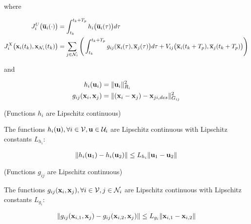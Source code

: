 where

\begin{align}
  J_i^U \big(\overline{\bm{\mathbf{u}}}_i (\cdot)\big) &=
    \int_{t_k}^{t_k + T_p} h_i \big(\overline{\bm{\mathbf{u}}}_i (\tau)\big) d \tau \\
  J_i^X \big(\bm{\mathbf{x}}_i (t_k), \bm{\mathbf{x}}_{\mathcal{N}_i}(t_k)\big) &=
    \sum_{j \in \mathcal{N}_i} \Bigg(\int_{t_k}^{t_k + T_p} g_{ij} (\overline{\bm{\mathbf{x}}}_i (\tau), \overline{\bm{\mathbf{x}}}_j (\tau)\big) d \tau +
    V_{ij} \big(\overline{\bm{\mathbf{x}}}_i (t_k + T_p), \overline{\bm{\mathbf{x}}}_j (t_k + T_p)\big)\Bigg)
\end{align}

and

\begin{align}
  h_i(\bm{\mathbf{u}}_i) &=\| \bm{\mathbf{u}}_i\|_{R_i}^2 \\
  g_{ij}(\bm{\mathbf{x}}_i, \bm{\mathbf{x}}_j) &= \| (\bm{\mathbf{x}}_i - \bm{\mathbf{x}}_j) - \bm{\mathbf{x}}_{ji,des} \|_{G_{ij}}^2
\end{align}


\begin{gg_box}
\begin{assumption} (Functions $h_i$ are Lipschitz continuous)

  The functions $h_i(\bm{\mathbf{u}}), \forall i \in \mathcal{V}, \bm{\mathbf{u}} \in \mathcal{U}_i$ are
  Lipschitz continuous with Lipschitz constants $L_{h_i}$:

  \begin{align}
    \| h_i(\bm{\mathbf{u}}_1) - h_i(\bm{\mathbf{u}}_2)\| \leq L_{h_i} \|\bm{\mathbf{u}}_1 - \bm{\mathbf{u}}_2 \|
  \end{align}

  \label{ass:h_i_Lipschitz}
\end{assumption}
\end{gg_box}

\begin{gg_box}
\begin{assumption} (Functions $g_{ij}$ are Lipschitz continuous)

  The functions $g_{ij}(\bm{\mathbf{x}}_i, \bm{\mathbf{x}}_j), \forall i \in \mathcal{V}, j \in \mathcal{N}_i$ are
  Lipschitz continuous with Lipschitz constants $L_{g_i}$:

  \begin{align}
    \| g_{ij}(\bm{\mathbf{x}}_{i,1}, \bm{\mathbf{x}}_j) - g_{ij}(\bm{\mathbf{x}}_{i,2}, \bm{\mathbf{x}}_j)\| \leq L_{g_i} \|\bm{\mathbf{x}}_{i,1} - \bm{\mathbf{x}}_{i,2} \|
  \end{align}

  \label{ass:g_ij_Lipschitz}
\end{assumption}
\end{gg_box}

